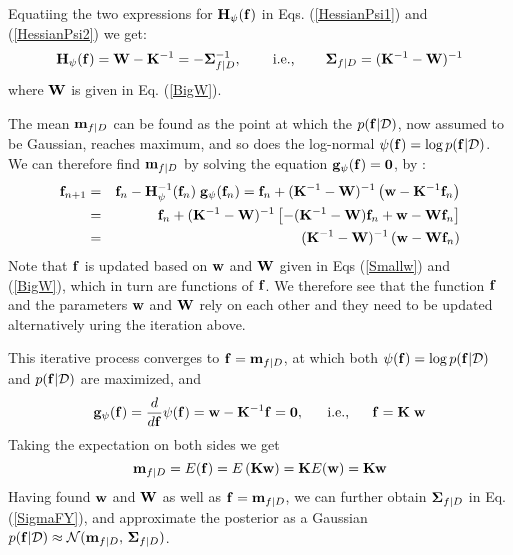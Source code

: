 \documentclass{article}
\begin{document}
Equatiing the two expressions for ${\bf H}_{\psi}({\bf f})$ in
Eqs. (\ref{HessianPsi1}) and (\ref{HessianPsi2}) we get:
\begin{equation}
  {\bf H}_\psi({\bf f})={\bf W}-{\bf K}^{-1}=-{\bf\Sigma}_{f|D}^{-1},
  \;\;\;\;\;\;\;\;\mbox{i.e.,}\;\;\;\;\;\;\;\;
  {\bf\Sigma}_{f|D}=({\bf K}^{-1}-{\bf W})^{-1}
  \label{SigmaFY}
\end{equation}
where ${\bf W}$ is given in Eq. (\ref{BigW}).

The mean ${\bf m}_{f|D}$ can be found as the point at which the 
$p({\bf f}|{\cal D})$, now assumed to be Gaussian, reaches maximum, 
and so does the log-normal $\psi({\bf f})=\log p({\bf f}|{\cal D})$.
We can therefore find ${\bf m}_{f|D}$ by solving the equation
${\bf g}_{\psi}({\bf f})={\bf 0}$, by 
:
\begin{eqnarray}
  {\bf f}_{n+1}&=&{\bf f}_n-{\bf H}_{\psi}^{-1}({\bf f}_n)\;{\bf g}_{\psi}({\bf f}_n)
  ={\bf f}_n+({\bf K}^{-1}-{\bf W})^{-1}
  \left({\bf w}-{\bf K}^{-1}{\bf f}_n\right)
  \nonumber\\
  &=&{\bf f}_n+({\bf K}^{-1}-{\bf W})^{-1}\left[-({\bf K}^{-1}-{\bf W}){\bf f}_n
    +{\bf w}-{\bf W}{\bf f}_n\right]
  \nonumber\\
  &=&({\bf K}^{-1}-{\bf W})^{-1}\left({\bf w}-{\bf W}{\bf f}_n\right)
  \label{GPCiteration}
\end{eqnarray}
Note that ${\bf f}$ is updated based on ${\bf w}$ and ${\bf W}$
given in Eqs (\ref{Smallw}) and (\ref{BigW}), which in turn are 
functions of ${\bf f}$. We therefore see that the function ${\bf f}$ 
and the parameters ${\bf w}$ and ${\bf W}$ rely on each other and 
they need to be updated alternatively uring the iteration above.

This iterative process converges to ${\bf f}={\bf m}_{f|D}$, 
at which both $\psi({\bf f})=\log p({\bf f}|{\cal D})$ and 
$p({\bf f}|{\cal D})$ are maximized, and
\begin{equation}
  {\bf g}_{\psi}({\bf f})=\frac{d}{d{\bf f}} \psi({\bf  f})
  ={\bf w}-{\bf K}^{-1}{\bf f} 
  ={\bf 0},\;\;\;\;\;\;\mbox{i.e.,}\;\;\;\;\;\;
  {\bf f}={\bf K}\;{\bf w}
  \label{aaa}
\end{equation}
Taking the expectation on both sides we get
\begin{equation}
  {\bf m}_{f|D}=E({\bf f})=E\left( {\bf K}{\bf w}\right)
  = {\bf K} E( {\bf w})={\bf K}{\bf w}
  \label{MeanFY}
\end{equation}
Having found ${\bf w}$ and ${\bf W}$ as well as
${\bf f}={\bf m}_{f|D}$, we can further obtain
${\bf\Sigma}_{f|D}$ in Eq. (\ref{SigmaFY}), and approximate 
the posterior as a Gaussian
$p({\bf f}|{\cal D})\approx{\cal N}({\bf m}_{f|D},\,{\bf\Sigma}_{f|D})$.
\end{document}
